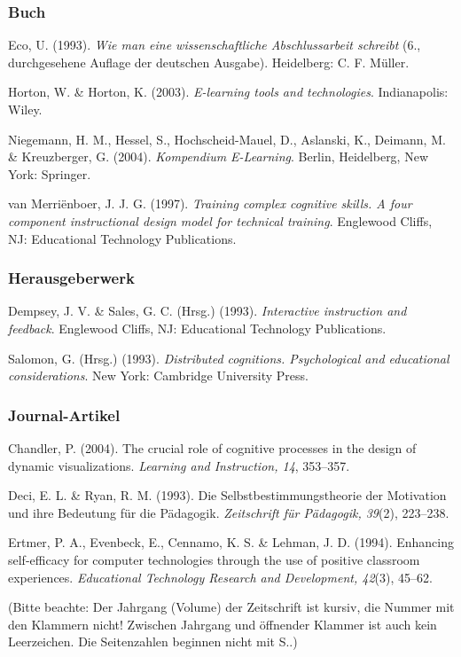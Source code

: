 \documentclass{../cssheet}
\begin{document}
\subsubsection*{Buch}

Eco, U. (1993). \emph{Wie man eine wissenschaftliche Abschlussarbeit
schreibt} (6., durchgesehene Auflage der deutschen Ausgabe). Heidelberg:
C. F. Müller.

Horton, W. \& Horton, K. (2003). \emph{E-learning tools and
technologies}. Indianapolis: Wiley.

Niegemann, H. M., Hessel, S., Hochscheid-Mauel, D., Aslanski, K.,
Deimann, M. \& Kreuzberger, G. (2004). \emph{Kompendium E-Learning}.
Berlin, Heidelberg, New York: Springer.

van Merriënboer, J. J. G. (1997). \emph{Training complex cognitive
skills. A four component instructional design model for technical
training}. Englewood Cliffs, NJ: Educational Technology Publications.

\subsubsection*{Herausgeberwerk}

Dempsey, J. V. \& Sales, G. C. (Hrsg.) (1993). \emph{Interactive
instruction and feedback}. Englewood Cliffs, NJ: Educational Technology
Publications.

Salomon, G. (Hrsg.) (1993). \emph{Distributed cognitions. Psychological
and educational considerations}. New York: Cambridge University Press.

\subsubsection*{Journal-Artikel}

Chandler, P. (2004). The crucial role of cognitive processes in the
design of dynamic visualizations. \emph{Learning and Instruction, 14},
353--357.

Deci, E. L. \& Ryan, R. M. (1993). Die Selbstbestimmungstheorie der
Motivation und ihre Bedeutung für die Pädagogik. \emph{Zeitschrift für
Pädagogik, 39}(2), 223--238.

Ertmer, P. A., Evenbeck, E., Cennamo, K. S. \& Lehman, J. D. (1994).
Enhancing self-efficacy for computer technologies through the use of
positive classroom experiences. \emph{Educational Technology Research
and Development, 42}(3), 45--62.

(Bitte beachte: Der Jahrgang (Volume) der Zeitschrift ist kursiv, die
Nummer mit den Klammern nicht! Zwischen Jahrgang und öffnender Klammer
ist auch kein Leerzeichen. Die Seitenzahlen beginnen nicht mit \glqq{}S.\grqq{}.)
\end{document}

